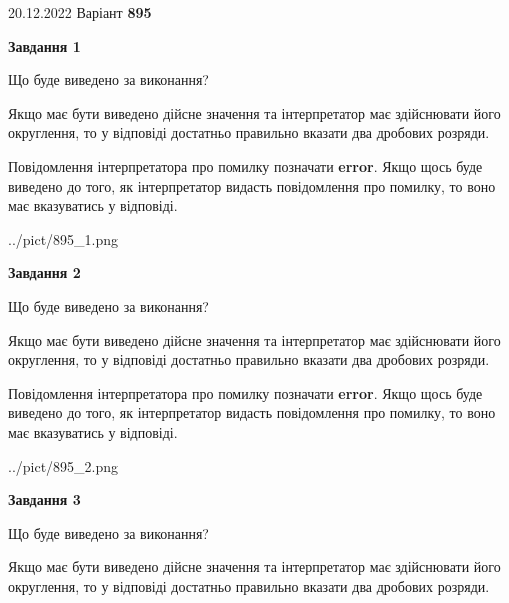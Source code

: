 \documentclass[12pt, ukrainian]{article}
\begin{document}
{20.12.2022 Варіант \No \textbf { 895 }\par}
{
\begin {Large}

{\begin {center}\textbf{Завдання 1}\end {center}}\par
Що буде виведено за виконання? \par

Якщо має бути виведено дійсне значення та інтерпретатор має здійснювати його округлення, 
то у відповіді достатньо правильно вказати два дробових розряди.

Повідомлення інтерпретатора про помилку позначати \textbf{error}.
Якщо щось буде виведено до того, як інтерпретатор видасть повідомлення про помилку, 
то воно має вказуватись у відповіді. \par

\begin{center}
	{../pict/895_1.png}
\end{center}
\newpage

{\begin {center}\textbf{Завдання 2}\end {center}}\par
Що буде виведено за виконання? \par

Якщо має бути виведено дійсне значення та інтерпретатор має здійснювати його округлення, 
то у відповіді достатньо правильно вказати два дробових розряди.

Повідомлення інтерпретатора про помилку позначати \textbf{error}.
Якщо щось буде виведено до того, як інтерпретатор видасть повідомлення про помилку, 
то воно має вказуватись у відповіді. \par

\begin{center}
	{../pict/895_2.png}
\end{center}
\newpage

{\begin {center}\textbf{Завдання 3}\end {center}}\par
Що буде виведено за виконання? \par

Якщо має бути виведено дійсне значення та інтерпретатор має здійснювати його округлення, 
то у відповіді достатньо правильно вказати два дробових розряди.


\end{Large}}
\end{document}
